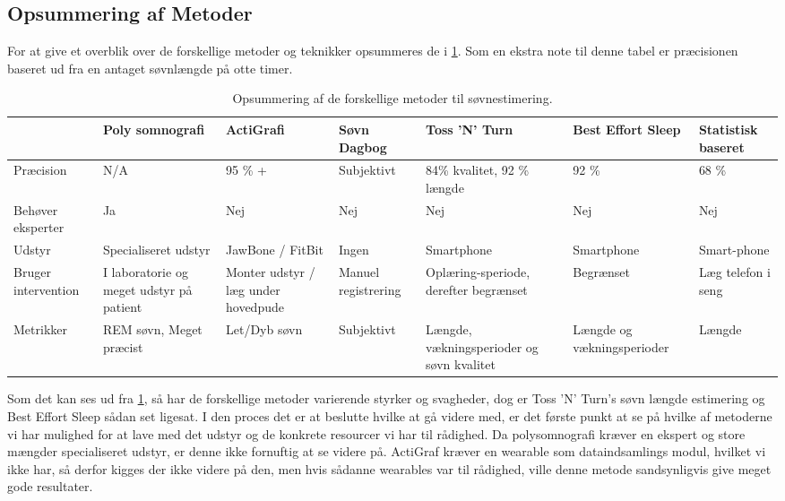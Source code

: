 \subsection{Opsummering af Metoder}
For at give et overblik over de forskellige metoder og teknikker opsummeres de i \cref{tab:opsummeringMetoder}.
Som en ekstra note til denne tabel er præcisionen baseret ud fra en antaget søvnlængde på otte timer. 

\begin{table}[h]
\begin{tabular}{|p{1.5cm}|p{2cm}|p{2cm}|p{2cm}|p{2cm}|p{2cm}|p{1.5cm}|}
\hline & Poly somnografi & ActiGrafi & Søvn Dagbog & Toss 'N' Turn & Best Effort Sleep  & Statistisk baseret\\ 
\hline Præcision & N/A & 95 \% + & Subjektivt & 84\% kvalitet, 92 \% længde & 92 \% & 68 \%\\ 
\hline Behøver eksperter & Ja & Nej & Nej & Nej & Nej & Nej \\ 
\hline Udstyr & Specialiseret udstyr & JawBone / FitBit & Ingen & Smartphone & Smartphone & Smart-phone \\ 
\hline Bruger intervention	& I laboratorie og meget udstyr på patient	& Monter udstyr / læg under hovedpude & Manuel registrering  & Oplæring-speriode, derefter begrænset & Begrænset & Læg telefon i seng \\ 
\hline Metrikker & REM søvn, Meget præcist	& Let/Dyb søvn & Subjektivt & Længde, vækningsperioder og søvn kvalitet & Længde og vækningsperioder & Længde \\ 
\hline 
\end{tabular}
\caption{Opsummering af de forskellige metoder til søvnestimering.}
\label{tab:opsummeringMetoder}
\end{table}
Som det kan ses ud fra \cref{tab:opsummeringMetoder}, så har de forskellige metoder varierende styrker og svagheder, dog er Toss 'N' Turn's søvn længde estimering og Best Effort Sleep sådan set ligesat.
I den proces det er at beslutte hvilke at gå videre med, er det første punkt at se på hvilke af metoderne vi har mulighed for at lave med det udstyr og de konkrete resourcer vi har til rådighed.
Da polysomnografi kræver en ekspert og store mængder specialiseret udstyr, er denne ikke fornuftig at se videre på.
ActiGraf kræver en wearable som dataindsamlings modul, hvilket vi ikke har, så derfor kigges der ikke videre på den, men hvis sådanne wearables var til rådighed, ville denne metode sandsynligvis give meget gode resultater.

